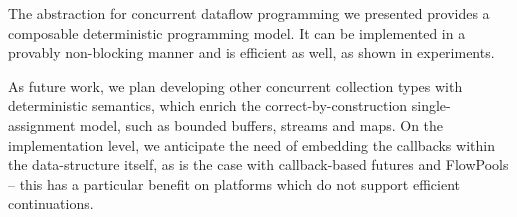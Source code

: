 The abstraction for concurrent dataflow programming we
presented provides a composable deterministic programming model.
It can be implemented in a provably non-blocking manner
and is efficient as well, as shown in experiments.

As future work, we plan developing other
concurrent collection types with deterministic semantics, which enrich
the correct-by-construction single-assignment model, such as
bounded buffers, streams and maps.
On the implementation level, we anticipate the need of embedding the
callbacks within the data-structure itself, as is the case with
callback-based futures and FlowPools -- this has a particular
benefit on platforms which do not support efficient
continuations.
